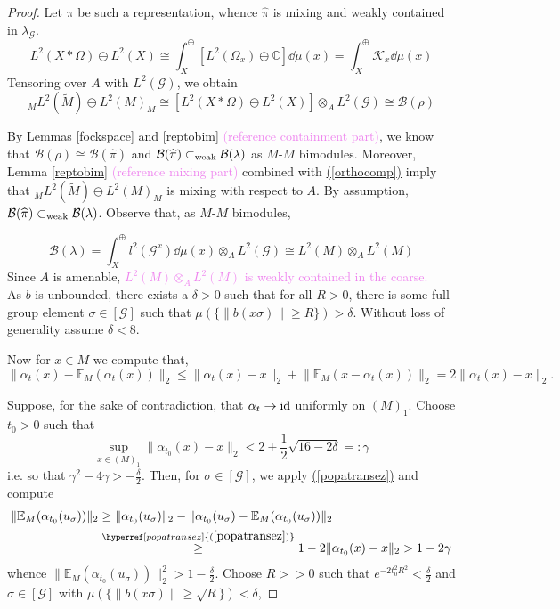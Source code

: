 \documentclass[a4paper,11pt]{article}
\renewcommand{\eqref}[1]{\hyperref[#1]{(\ref{#1})}}
\numberwithin{equation}{section}
\theoremstyle{definition}
\theoremstyle{remark}
\numberwithin{equation}{section}
\newcommand{\rG}{\mathcal{G}}
\newcommand{\B}{\mathcal{B}}
\newcommand{\C}{\mathbb{C}}
\newcommand{\E}{\mathbb{E}}
\def\K{\mathcal K}
\newcommand{\subwk}{\subset_{\rm{weak}}}
\providecommand{\norm}[1]{\lVert#1\rVert}
\numberwithin{equation}{section}
\begin{document}
\begin{proof}
   Let $\pi$ be such a representation, whence $\widehat{\pi}$ is mixing and weakly contained in $\lambda_\rG$. 
    \[
        L^2(X\ast \Omega) \ominus L^2(X) \cong \int_X^\oplus [L^2(\Omega_x) \ominus \C] \dd{\mu(x)} = \int_X^\oplus \K_x \dd{\mu(x)} 
    \]
    Tensoring over $A$ with $L^2(\rG)$, we obtain
    \begin{equation}\label{orthocomp}
        _M L^2(\widetilde{M}) \ominus L^2(M)_M \cong [L^2(X\ast \Omega) \ominus L^2(X)]\otimes_A L^2(\rG) \cong \B(\rho)
    \end{equation}

    By Lemmas \ref{fockspace} and \ref{reptobim} \textcolor{violet}{(reference containment part)}, we know that $\B(\rho) \cong \B(\widehat{\pi})$ and $\B(\widehat{\pi}) \subwk \B(\lambda)$ as $M$-$M$ bimodules. Moreover, Lemma \ref{reptobim} \textcolor{violet}{(reference mixing part)} combined with \eqref{orthocomp} imply that $_M L^2(\widetilde{M}) \ominus L^2(M)_M$ is mixing with respect to $A$. By assumption, $\B(\widehat{\pi})\subwk \B(\lambda)$. Observe that, as $M$-$M$ bimodules, 

    \[
        \B(\lambda) = \int_X^{\oplus} l^2(\rG^x) \dd{\mu(x)} \otimes_A L^2(\rG) \cong L^2(M) \otimes_A L^2(M)
    \]
    Since $A$ is amenable, \textcolor{violet}{$L^2(M)\otimes_A L^2(M)$ is weakly contained in the coarse.}\\


    As $ b $ is unbounded, there exists a $ \delta>0 $ such that for all $ R>0 $, there is some full group element $ \sigma\in [\rG] $ such that $ \mu(\{\norm{b(x \sigma)}\geq R\}) > \delta $. Without loss of generality assume $ \delta < 8 $.

    Now for $ x\in M $ we compute that,
    \begin{equation}\label{popatransez}
        \norm{\alpha_{t}(x) - \E_{M}(\alpha_{t}(x))}_{2} \leq \norm{\alpha_{t}(x) - x}_{2} + \norm{\E_{M}(x - \alpha_{t}(x))}_{2} = 2 \norm{\alpha_{t}(x) - x}_{2}.
    \end{equation}

    Suppose, for the sake of contradiction, that $ \alpha_{t}\to {\rm id }$ uniformly on $ (M)_{1} $. Choose $ t_{0} > 0 $ such that
    \[
        \sup_{x\in (M)_{1}} \norm{\alpha_{t_{0}}(x) - x}_{2} < 2+ \frac{1}{2}\sqrt{16-2\delta} =: \gamma
    \]
    i.e. so that $ \gamma^{2}-4\gamma > -\frac{\delta}{2} $. Then, for $ \sigma\in [\rG] $, we apply \eqref{popatransez} and compute
    \begin{align*}
        \norm{\E_{M}(\alpha_{t_{0}}(u_{\sigma}))}_{2} &\geq \norm{\alpha_{t_0}(u_{\sigma})}_{2} -\norm{\alpha_{t_0}(u_{\sigma}) - \E_{M}(\alpha_{t_0}(u_{\sigma}))}_{2}\\
        & \overset{\eqref{popatransez}}{\geq} 1 - 2\norm{\alpha_{t_0}(x) - x}_{2} > 1-2\gamma
    \end{align*}
    whence $  \norm{\E_{M}(\alpha_{t_{0}}(u_{\sigma}))}_{2}^{2} > 1-\frac{\delta}{2} $. Choose $ R>>0 $ such that $ e^{-2t_{0}^{2}R^2} < \frac{\delta}{2} $ and $ \sigma\in [\rG] $ with $ \mu(\{\norm{b(x \sigma)}\geq \sqrt{R}\}) < \delta $,


\end{proof}
\end{document}
